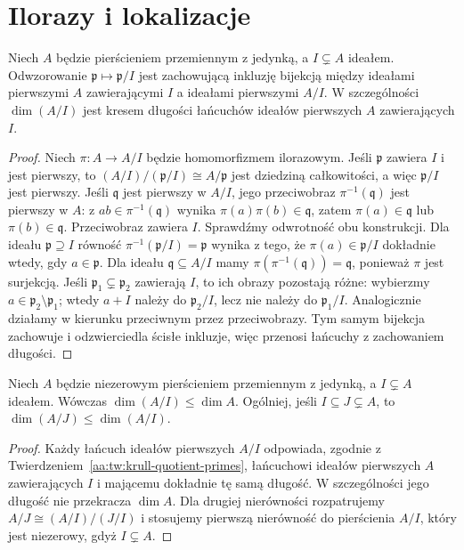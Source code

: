 \section{Ilorazy i lokalizacje}
\begin{twierdzenie}\label{aa:tw:krull-quotient-primes}
Niech $A$ będzie pierścieniem przemiennym z jedynką, a $I\subsetneq A$
ideałem. Odwzorowanie $\mathfrak p\mapsto\mathfrak p/I$ jest
zachowującą inkluzję bijekcją między ideałami pierwszymi $A$
zawierającymi $I$ a ideałami pierwszymi $A/I$.
W szczególności $\dim(A/I)$ jest kresem długości łańcuchów
ideałów pierwszych $A$ zawierających $I$.
\end{twierdzenie}
\begin{proof}
Niech $\pi:A\to A/I$ będzie homomorfizmem ilorazowym.
Jeśli $\mathfrak p$ zawiera $I$ i jest pierwszy, to
$(A/I)/(\mathfrak p/I)\cong A/\mathfrak p$ jest dziedziną
całkowitości, a więc $\mathfrak p/I$ jest pierwszy.
Jeśli $\mathfrak q$ jest pierwszy w $A/I$, jego przeciwobraz
$\pi^{-1}(\mathfrak q)$ jest pierwszy w $A$: z
$ab\in\pi^{-1}(\mathfrak q)$ wynika
$\pi(a)\pi(b)\in\mathfrak q$, zatem $\pi(a)\in\mathfrak q$
lub $\pi(b)\in\mathfrak q$. Przeciwobraz zawiera $I$.
Sprawdźmy odwrotność obu konstrukcji. Dla ideału
$\mathfrak p\supseteq I$ równość
$\pi^{-1}(\mathfrak p/I)=\mathfrak p$ wynika z tego, że
$\pi(a)\in\mathfrak p/I$ dokładnie wtedy, gdy
$a\in\mathfrak p$. Dla ideału $\mathfrak q\subseteq A/I$
mamy $\pi(\pi^{-1}(\mathfrak q))=\mathfrak q$, ponieważ
$\pi$ jest surjekcją. Jeśli $\mathfrak p_1\subsetneq
\mathfrak p_2$ zawierają $I$, to ich obrazy pozostają różne:
wybierzmy $a\in\mathfrak p_2\setminus\mathfrak p_1$;
wtedy $a+I$ należy do $\mathfrak p_2/I$, lecz nie należy
do $\mathfrak p_1/I$. Analogicznie działamy w kierunku
przeciwnym przez przeciwobrazy. Tym samym bijekcja zachowuje
i odzwierciedla ścisłe inkluzje, więc przenosi łańcuchy
z zachowaniem długości.
\end{proof}




\begin{wniosek}
\label{aa:cor:krull-quotient-bound}
Niech $A$ będzie niezerowym pierścieniem przemiennym z jedynką,
a $I\subsetneq A$ ideałem. Wówczas $\dim(A/I)\leq\dim A$.
Ogólniej, jeśli $I\subseteq J\subsetneq A$, to
$\dim(A/J)\leq\dim(A/I)$.
\end{wniosek}
\begin{proof}
Każdy łańcuch ideałów pierwszych $A/I$ odpowiada, zgodnie z
Twierdzeniem~\ref{aa:tw:krull-quotient-primes}, łańcuchowi
ideałów pierwszych $A$ zawierających $I$ i mającemu dokładnie
tę samą długość. W szczególności jego długość nie przekracza
$\dim A$. Dla drugiej nierówności rozpatrujemy
$A/J\cong(A/I)/(J/I)$ i stosujemy pierwszą nierówność
do pierścienia $A/I$, który jest niezerowy, gdyż $I\subsetneq A$.
\end{proof}

